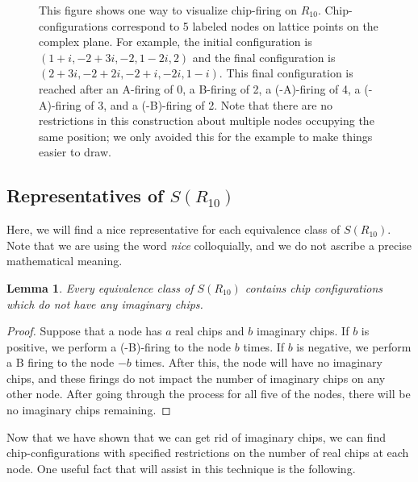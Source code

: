 \documentclass[12p]{amsart}
\numberwithin{equation}{section}
\theoremstyle{plain}
\newtheorem{lemma}[thm]{Lemma}
\theoremstyle{definition}
\begin{document}
\begin{figure}
\begin{center}
    \caption{This figure shows one way to visualize chip-firing on $R_{10}$. Chip-configurations correspond to 5 labeled nodes on lattice points on the complex plane. For example, the initial configuration is $(1+i, -2 + 3i, -2, 1-2i, 2)$ and the final configuration is $(2+3i, -2 + 2i, -2 + i,-2i, 1-i)$. This final configuration is reached after an A-firing of 0, a B-firing of 2, a (-A)-firing of 4, a (-A)-firing of 3, and a (-B)-firing of 2. Note that there are no restrictions in this construction about multiple nodes occupying the same position; we only avoided this for the example to make things easier to draw.}
    \label{fig:geometric}
\end{center}
\end{figure}

\subsection{Representatives of $S(R_{10})$}
Here, we will find a nice representative for each equivalence class of $S(R_{10})$. Note that we are using the word \emph{nice} colloquially, and we do not ascribe a precise mathematical meaning. 

\begin{lemma}\label{lem:no_i}
    Every equivalence class of $S(R_{10})$ contains chip configurations which do not have any imaginary chips. 
\end{lemma}
\begin{proof}
    Suppose that a node has $a$ real chips and $b$ imaginary chips. If $b$ is positive, we perform a (-B)-firing to the node $b$ times. If $b$ is negative, we perform a B firing to the node $-b$ times. After this, the node will have no imaginary chips, and these firings do not impact the number of imaginary chips on any other node. After going through the process for all five of the nodes, there will be no imaginary chips remaining. 
\end{proof}

Now that we have shown that we can get rid of imaginary chips, we can find chip-configurations with specified restrictions on the number of real chips at each node. One useful fact that will assist in this technique is the following. 
\end{document}
